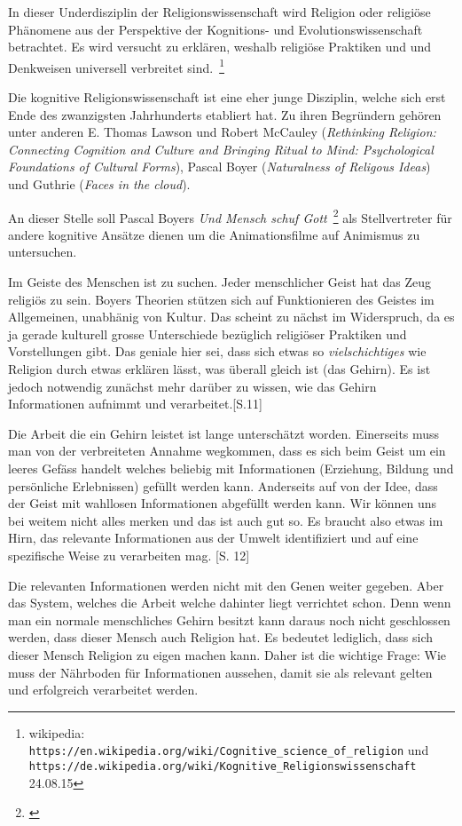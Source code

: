 In dieser Underdisziplin der Religionswissenschaft wird Religion oder religiöse Phänomene aus der Perspektive der Kognitions- und Evolutionswissenschaft betrachtet. Es wird versucht zu erklären, weshalb religiöse Praktiken und und Denkweisen universell verbreitet sind.~\footnote{wikipedia: \texttt{https://en.wikipedia.org/wiki/Cognitive\_science\_of\_religion} und \texttt{https://de.wikipedia.org/wiki/Kognitive\_Religionswissenschaft} 24.08.15}

Die kognitive Religionswissenschaft ist eine eher junge Disziplin, welche sich erst Ende des zwanzigsten Jahrhunderts etabliert hat. Zu ihren Begründern gehören unter anderen E. Thomas Lawson und Robert McCauley (\emph{Rethinking Religion: Connecting Cognition and Culture and Bringing Ritual to Mind: Psychological Foundations of Cultural Forms}), Pascal Boyer (\emph{Naturalness of Religous Ideas}) und Guthrie (\emph{Faces in the cloud}).

An dieser Stelle soll Pascal Boyers \emph{Und Mensch schuf Gott}~\footnote{\cite{boyer04}} als Stellvertreter für andere kognitive Ansätze dienen um die Animationsfilme auf Animismus zu untersuchen. 

Im Geiste des Menschen ist zu suchen. Jeder menschlicher Geist hat das Zeug religiös zu sein. Boyers Theorien stützen sich auf Funktionieren des Geistes im Allgemeinen, unabhänig von Kultur. Das scheint zu nächst im Widerspruch, da es ja gerade kulturell grosse Unterschiede bezüglich religiöser Praktiken und Vorstellungen gibt. Das geniale hier sei, dass sich etwas so \emph{vielschichtiges} wie Religion durch etwas erklären lässt, was überall gleich ist (das Gehirn). Es ist jedoch notwendig zunächst mehr darüber zu wissen, wie das Gehirn Informationen aufnimmt und verarbeitet.[S.11]

Die Arbeit die ein Gehirn leistet ist lange unterschätzt worden. Einerseits muss man von der verbreiteten Annahme wegkommen, dass es sich beim Geist um ein leeres Gefäss handelt welches beliebig mit Informationen (Erziehung, Bildung und persönliche Erlebnissen) gefüllt werden kann. Anderseits auf von der Idee, dass der Geist mit wahllosen Informationen abgefüllt werden kann. Wir können uns bei weitem nicht alles merken und das ist auch gut so. Es braucht also etwas im Hirn, das relevante Informationen aus der Umwelt identifiziert und auf eine spezifische Weise zu verarbeiten mag. [S. 12]

Die relevanten Informationen werden nicht mit den Genen weiter gegeben. Aber das System, welches die Arbeit welche dahinter liegt verrichtet schon. Denn wenn man ein normale menschliches Gehirn besitzt kann daraus noch nicht geschlossen werden, dass dieser Mensch auch Religion hat. Es bedeutet lediglich, dass sich dieser Mensch Religion zu eigen machen kann. Daher ist die wichtige Frage: Wie muss der Nährboden für Informationen aussehen, damit sie als relevant gelten und erfolgreich verarbeitet werden. 


